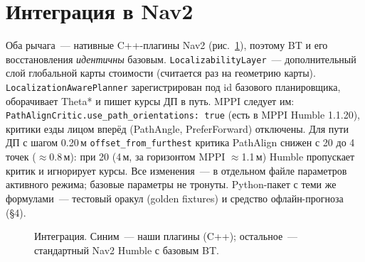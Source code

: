 \documentclass[10pt,twocolumn]{article}
\begin{document}
\section{Интеграция в Nav2}
Оба рычага~--- нативные C++-плагины Nav2 (рис.~\ref{fig:nav2}), поэтому BT и его восстановления \emph{идентичны} базовым. \texttt{LocalizabilityLayer}~--- дополнительный слой глобальной карты стоимости (считается раз на геометрию карты). \texttt{LocalizationAwarePlanner} зарегистрирован под id базового планировщика, оборачивает Theta* и пишет курсы ДП в путь. MPPI следует им: \texttt{PathAlignCritic.use\_path\_orientations: true} (есть в MPPI Humble 1.1.20), критики езды лицом вперёд (PathAngle, PreferForward) отключены. Для пути ДП с шагом 0.20\,м \texttt{offset\_from\_furthest} критика PathAlign снижен с 20 до 4 точек ($\approx$0.8\,м): при 20 (4\,м, за горизонтом MPPI $\approx$1.1\,м) Humble пропускает критик и игнорирует курсы. Все изменения~--- в отдельном файле параметров активного режима; базовые параметры не тронуты. Python-пакет с теми же формулами~--- тестовый оракул (golden fixtures) и средство офлайн-прогноза (\S4).

\begin{figure}[t]
\centering
{}
\caption{Интеграция. Синим~--- наши плагины (C++); остальное~--- стандартный Nav2 Humble с базовым BT.}
\label{fig:nav2}
\end{figure}
\end{document}
